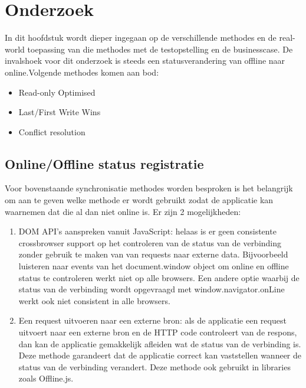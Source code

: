 
\chapter{Onderzoek}
\label{ch:onderzoek}

In dit hoofdstuk wordt dieper ingegaan op de verschillende methodes  en de real-world toepassing van die methodes met de testopstelling en de businesscase. De invalshoek voor dit onderzoek is steeds een statusverandering van offline naar online.Volgende methodes komen aan bod:
\begin{itemize}
\item Read-only Optimised
\item Last/First Write Wins
\item Conflict resolution
\end{itemize}

\section{Online/Offline status registratie}
Voor bovenstaande synchronisatie methodes worden besproken is het belangrijk om aan te geven welke methode er wordt gebruikt zodat de applicatie kan waarnemen dat die al dan niet online is. Er zijn 2 mogelijkheden:
\begin{enumerate}
\item DOM API's aanspreken vanuit JavaScript: helaas is er geen consistente crossbrowser support op het controleren van de status van de verbinding zonder gebruik te maken van van requests naar externe data. Bijvoorbeeld luisteren naar events van het document.window object om online en offline status te controleren werkt niet op alle browsers. Een andere optie waarbij de status van de verbinding wordt opgevraagd met window.navigator.onLine werkt ook niet consistent in alle browsers.
\item Een request uitvoeren naar een externe bron: als de applicatie een request uitvoert naar een externe bron en de HTTP code controleert van de respons, dan kan de applicatie gemakkelijk afleiden wat de status van de verbinding is. Deze methode garandeert dat de applicatie correct kan vaststellen wanneer de status van de verbinding verandert. Deze methode ook gebruikt in libraries zoals Offline.js.
\end{enumerate}

